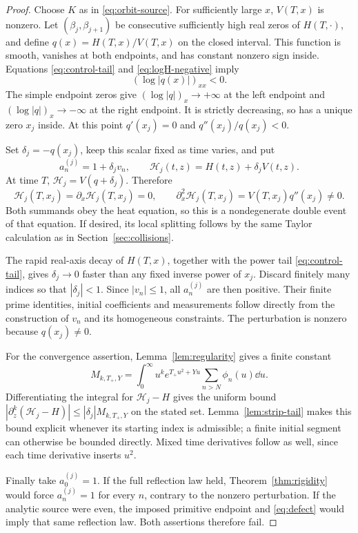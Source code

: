\begin{proof}
Choose $K$ as in \eqref{eq:orbit-source}. For sufficiently large $x$,
$V(T,x)$ is nonzero. Let $(\beta_j,\beta_{j+1})$ be consecutive sufficiently
high real zeros of $H(T,\cdot)$, and define
$q(x)=H(T,x)/V(T,x)$ on the closed interval. This function is smooth,
vanishes at both endpoints, and has constant nonzero sign inside.
Equations \eqref{eq:control-tail} and \eqref{eq:logH-negative} imply
\[
 (\log|q(x)|)_{xx}<0 .
\]
The simple endpoint zeros give
$(\log|q|)_x\to+\infty$ at the left endpoint and
$(\log|q|)_x\to-\infty$ at the right endpoint. It is strictly decreasing,
so has a unique zero $x_j$ inside. At this point $q'(x_j)=0$ and
$q''(x_j)/q(x_j)<0$.

Set $\delta_j=-q(x_j)$, keep this scalar fixed as time varies, and put
\[
 a_n^{(j)}=1+\delta_jv_n,\qquad
 \mathcal H_j(t,z)=H(t,z)+\delta_jV(t,z).
\]
At time $T$, $\mathcal H_j=V(q+\delta_j)$. Therefore
\[
 \mathcal H_j(T,x_j)=\partial_x\mathcal H_j(T,x_j)=0,\qquad
 \partial_x^2\mathcal H_j(T,x_j)=V(T,x_j)q''(x_j)\ne0 .
\]
Both summands obey the heat equation, so this is a nondegenerate double
event of that equation. If desired, its local splitting follows by the
same Taylor calculation as in Section~\ref{sec:collisions}.

The rapid real-axis decay of $H(T,x)$, together with the power tail
\eqref{eq:control-tail}, gives $\delta_j\to0$ faster than any fixed
inverse power of $x_j$. Discard finitely many indices so that
$|\delta_j|<1$. Since $|v_n|\le1$, all $a_n^{(j)}$ are then positive.
Their finite prime identities, initial coefficients and measurements
follow directly from the construction of $v_n$ and its homogeneous
constraints. The perturbation is nonzero because $q(x_j)\ne0$.

For the convergence assertion, Lemma~\ref{lem:regularity} gives a finite
constant
\[
 M_{k,T_+,Y}=\int_0^\infty u^k e^{T_+u^2+Yu}
                         \sum_{n>N}\phi_n(u)\dd u .
\]
Differentiating the integral for $\mathcal H_j-H$ gives the uniform bound
$|\partial_z^k(\mathcal H_j-H)|\le|\delta_j|M_{k,T_+,Y}$ on the stated
set. Lemma~\ref{lem:strip-tail} makes this bound explicit whenever its
starting index is admissible; a finite initial segment can otherwise be
bounded directly. Mixed time derivatives follow as well, since each
time derivative inserts $u^2$.

Finally take $a_0^{(j)}=1$. If the full reflection law held,
Theorem~\ref{thm:rigidity} would force $a_n^{(j)}=1$ for every $n$,
contrary to the nonzero perturbation. If the analytic source were even,
the imposed primitive endpoint and \eqref{eq:defect} would imply that
same reflection law. Both assertions therefore fail.
\end{proof}

